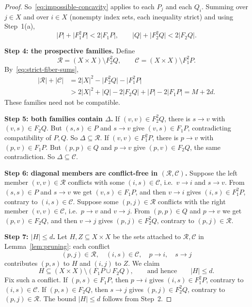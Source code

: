 \documentclass[11pt]{article}
\theoremstyle{remark}
\newcommand{\abs}[1]{\lvert #1\rvert}
\newcommand{\step}[1]{\par\medskip\noindent\textbf{#1}\enspace}
\begin{document}
\begin{proof}
So~\eqref{eq:impossible-concavity} applies to each $P_j$ and each $Q_i$.
Summing over $j\in X$ and over $i\in X$ (nonempty index sets, each
inequality strict) and using Step~1(a),
\begin{equation}\label{eq:strict-fiber-sums}
 \abs{P}+\abs{F_1^2P}<2\abs{F_1P},\qquad
 \abs{Q}+\abs{F_2^2Q}<2\abs{F_2Q}.
\end{equation}

\step{Step 4: the prospective families.}
Define
\[
 \mathcal R=(X\times X)\setminus F_2^2Q,
 \qquad
 \mathcal C=(X\times X)\setminus F_1^2P.
\]
By~\eqref{eq:strict-fiber-sums},
\begin{equation}\label{eq:complement-gain}
 \begin{aligned}
 \abs{\mathcal R}+\abs{\mathcal C}
 &=2\abs{X}^2-\abs{F_2^2Q}-\abs{F_1^2P}\\
 &>2\abs{X}^2+\abs Q-2\abs{F_2Q}+\abs P-2\abs{F_1P}
 =M+2d.
 \end{aligned}
\end{equation}
These families need not be compatible.

\step{Step 5: both families contain $\Delta$.}
If $(v,v)\in F_2^2Q$, there is $s\to v$ with $(v,s)\in F_2Q$.
But $(s,s)\in P$ and $s\to v$ give $(v,s)\in F_1P$, contradicting
compatibility of $P,Q$.  So $\Delta\subseteq\mathcal R$.
If $(v,v)\in F_1^2P$, there is $p\to v$ with $(p,v)\in F_1P$.
But $(p,p)\in Q$ and $p\to v$ give $(p,v)\in F_2Q$, the same contradiction.
So $\Delta\subseteq\mathcal C$.

\step{Step 6: diagonal members are conflict-free in
$(\mathcal R,\mathcal C)$.}
Suppose the left member $(v,v)\in\mathcal R$ conflicts with some
$(i,s)\in\mathcal C$, i.e.\ $v\to i$ and $s\to v$.  From $(s,s)\in P$ and
$s\to v$ we get $(v,s)\in F_1P$, and then $v\to i$ gives
$(i,s)\in F_1^2P$, contrary to $(i,s)\in\mathcal C$.
Suppose some $(p,j)\in\mathcal R$ conflicts with the right member
$(v,v)\in\mathcal C$, i.e.\ $p\to v$ and $v\to j$.  From $(p,p)\in Q$ and
$p\to v$ we get $(p,v)\in F_2Q$, and then $v\to j$ gives
$(p,j)\in F_2^2Q$, contrary to $(p,j)\in\mathcal R$.

\step{Step 7: $\abs H\le d$.}
Let $H,Z\subseteq X\times X$ be the sets attached to
$\mathcal R,\mathcal C$ in Lemma~\ref{lem:pruning}: each conflict
\[
 (p,j)\in\mathcal R,\quad (i,s)\in\mathcal C,\quad
 p\to i,\quad s\to j
\]
contributes $(p,s)$ to $H$ and $(i,j)$ to $Z$.  We claim
\begin{equation}\label{eq:old-uncovered-bound}
 H\subseteq (X\times X)\setminus(F_1P\cup F_2Q),
 \qquad\text{and hence}\qquad \abs{H}\le d.
\end{equation}
Fix such a conflict.  If $(p,s)\in F_1P$, then $p\to i$ gives
$(i,s)\in F_1^2P$, contrary to $(i,s)\in\mathcal C$.
If $(p,s)\in F_2Q$, then $s\to j$ gives $(p,j)\in F_2^2Q$, contrary to
$(p,j)\in\mathcal R$.  The bound $\abs H\le d$ follows from Step~2.


\end{proof}
\end{document}
